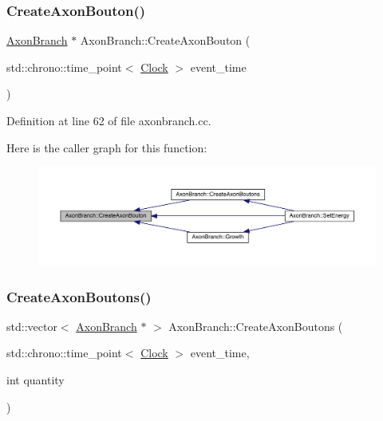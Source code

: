 \subsubsection{\texorpdfstring{Create\+Axon\+Bouton()}{CreateAxonBouton()}}
{\footnotesize\ttfamily \hyperlink{class_axon_branch}{Axon\+Branch} $\ast$ Axon\+Branch\+::\+Create\+Axon\+Bouton (\begin{DoxyParamCaption}\item[{std\+::chrono\+::time\+\_\+point$<$ \hyperlink{universe_8h_a0ef8d951d1ca5ab3cfaf7ab4c7a6fd80}{Clock} $>$}]{event\+\_\+time }\end{DoxyParamCaption})}



Definition at line 62 of file axonbranch.\+cc.

Here is the caller graph for this function\+:
\nopagebreak
\begin{figure}[H]
\begin{center}
\leavevmode
\includegraphics[width=350pt]{class_axon_branch_a30b4602e5dd121666478ff9de52d022b_icgraph}
\end{center}
\end{figure}
\mbox{\label{class_axon_branch_a77e93626a7993f76e689d09721974e90}} 
\subsubsection{\texorpdfstring{Create\+Axon\+Boutons()}{CreateAxonBoutons()}}
{\footnotesize\ttfamily std\+::vector$<$ \hyperlink{class_axon_branch}{Axon\+Branch} $\ast$ $>$ Axon\+Branch\+::\+Create\+Axon\+Boutons (\begin{DoxyParamCaption}\item[{std\+::chrono\+::time\+\_\+point$<$ \hyperlink{universe_8h_a0ef8d951d1ca5ab3cfaf7ab4c7a6fd80}{Clock} $>$}]{event\+\_\+time,  }\item[{int}]{quantity }\end{DoxyParamCaption})}



